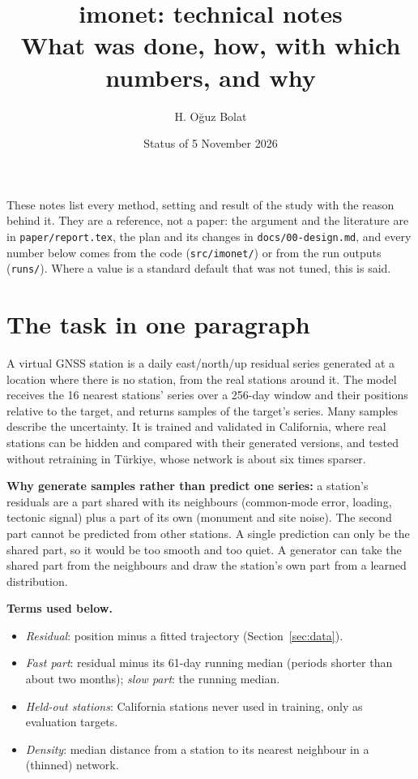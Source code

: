 \documentclass[11pt,a4paper]{article}
\title{imonet: technical notes\\[0.3em]\large What was done, how, with which numbers, and why}
\author{H. Oğuz Bolat}
\date{Status of 5 November 2026}
\begin{document}
\maketitle

\noindent These notes list every method, setting and result of the study with the reason behind it. They are a reference, not a paper: the argument and the literature are in \texttt{paper/report.tex}, the plan and its changes in \texttt{docs/00-design.md}, and every number below comes from the code (\texttt{src/imonet/}) or from the run outputs (\texttt{runs/}). Where a value is a standard default that was not tuned, this is said.

\tableofcontents

\section{The task in one paragraph}

A virtual GNSS station is a daily east/north/up residual series generated at a location where there is no station, from the real stations around it. The model receives the 16 nearest stations' series over a 256-day window and their positions relative to the target, and returns samples of the target's series. Many samples describe the uncertainty. It is trained and validated in California, where real stations can be hidden and compared with their generated versions, and tested without retraining in Türkiye, whose network is about six times sparser.

\textbf{Why generate samples rather than predict one series:} a station's residuals are a part shared with its neighbours (common-mode error, loading, tectonic signal) plus a part of its own (monument and site noise). The second part cannot be predicted from other stations. A single prediction can only be the shared part, so it would be too smooth and too quiet. A generator can take the shared part from the neighbours and draw the station's own part from a learned distribution.

\textbf{Terms used below.}
\begin{itemize}
\item \emph{Residual}: position minus a fitted trajectory (Section~\ref{sec:data}).
\item \emph{Fast part}: residual minus its 61-day running median (periods shorter than about two months); \emph{slow part}: the running median.
\item \emph{Held-out stations}: California stations never used in training, only as evaluation targets.
\item \emph{Density}: median distance from a station to its nearest neighbour in a (thinned) network.
\end{itemize}
\end{document}

